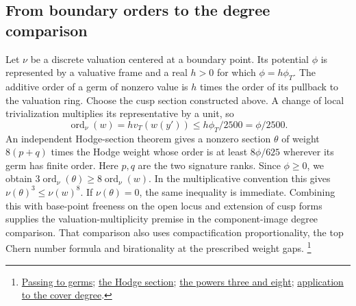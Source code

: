 \subsection{From boundary orders to the degree comparison}
Let \(\nu\) be a discrete valuation centered at a boundary point. Its
potential \(\phi\) is represented by a valuative frame and a real \(h>0\)
for which \(\phi=h\phi_T\). The additive order of a germ of nonzero
value is \(h\) times the order of its pullback to the valuation ring.
Choose the cusp section constructed above. A change of local
trivialization multiplies its representative by a unit, so
\[
  \operatorname{ord}_{\nu}(w)=h v_T(w(y'))\le h\phi_T/2500=\phi/2500 .
\]
An independent Hodge-section theorem gives a nonzero section \(\theta\)
of weight \(8(p+q)\) times the Hodge weight whose order is at least
\(8\phi/625\) wherever its germ has finite order. Here \(p,q\) are the
two signature ranks. Since \(\phi\ge0\), we obtain
\(3\operatorname{ord}_\nu(\theta)\ge8\operatorname{ord}_\nu(w)\).
In the multiplicative convention this gives
\(\nu(\theta)^3\le\nu(w)^8\). If \(\nu(\theta)=0\), the same inequality
is immediate. Combining this with base-point freeness on the open
locus and extension of cusp forms supplies the valuation-multiplicity
premise in the component-image degree comparison. That comparison
also uses compactification proportionality, the top Chern number
formula and birationality at the prescribed weight gaps.
\footnote{\href{https://github.com/Deicyde/riemann-hypothesis/blob/40e56bab/src/Development/AutomorphicArithmetic/ThetaCorrespondence/ThetaPairLifts/ThirdPlaceSeries/ExistsSectionOrderBoundHilbertSamuel.lean\#L22-L46}{Passing to germs};
\href{https://github.com/Deicyde/riemann-hypothesis/blob/40e56bab/src/Development/AutomorphicArithmetic/ThetaCorrespondence/ThetaPairLifts/ThirdPlaceSeries/ExistsNonzeroSectionWeightBound.lean\#L79-L82}{the Hodge section};
\href{https://github.com/Deicyde/riemann-hypothesis/blob/40e56bab/src/Development/AutomorphicArithmetic/ThetaCorrespondence/ThetaPairLifts/ThirdPlaceSeries/ValuationMultiplicityOfConsecutiveRun.lean\#L48-L97}{the powers three and eight};
\href{https://github.com/Deicyde/riemann-hypothesis/blob/40e56bab/src/Development/AutomorphicArithmetic/ThetaCorrespondence/ThetaPairLifts/ThirdPlaceSeries/CoveringDegreeMultiplicative.lean\#L25-L56}{application to the cover degree}.}

